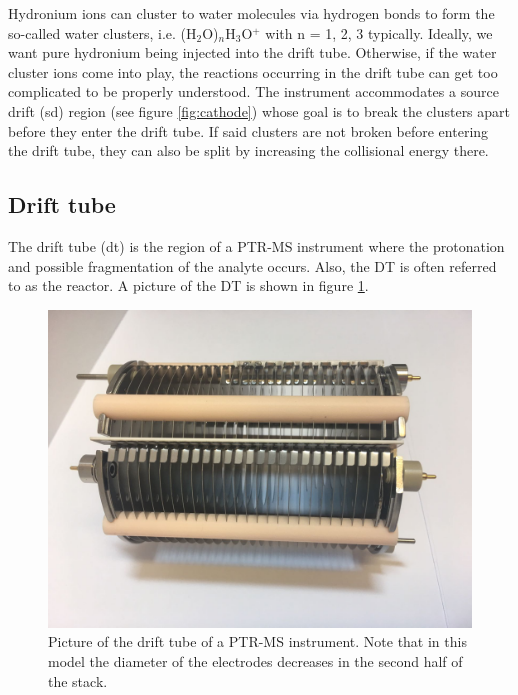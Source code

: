 Hydronium ions can cluster to water molecules via hydrogen bonds to form the so-called water clusters, i.e. (H$_2$O)$_n$H$_3$O$^+$ with n = 1, 2, 3 typically. Ideally, we want pure hydronium being injected into the drift tube. Otherwise, if the water cluster ions come into play, the reactions occurring in the drift tube can get too complicated to be properly understood. The instrument accommodates a source drift (\acrshort{sd}) region (see figure \ref{fig:cathode}) whose goal is to break the clusters apart before they enter the drift tube. If said clusters are not broken before entering the drift tube, they can also be split by increasing the collisional energy there.

\subsection{Drift tube}
The drift tube (\acrshort{dt}) is the region of a PTR-MS instrument where the protonation and possible fragmentation of the analyte occurs. Also, the DT is often referred to as the reactor. A picture of the DT is shown in figure \ref{fig:dt}.

\begin{figure}%
\centering
\includegraphics[width=0.8\linewidth]{pics/IMG-20170119-WA0008.jpg}
\centering
\caption[Picture of the drift tube of a PTR-MS instrument.]{Picture of the drift tube of a PTR-MS instrument. Note that in this model the diameter of the electrodes decreases in the second half of the stack.}
\label{fig:dt}
\end{figure}

